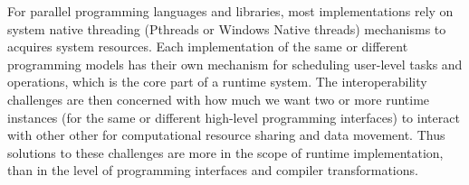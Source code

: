 For parallel programming languages and libraries, most implementations rely on system native threading (Pthreads or Windows Native threads) 
mechanisms to acquires system resources. Each implementation of the same or different programming models has their own mechanism for scheduling
user-level tasks and operations, which is the core part of a runtime system. 
The interoperability challenges are then concerned with how much we want two or more 
runtime instances (for the same or different high-level programming interfaces) to interact with other other for computational resource sharing
and data movement. Thus solutions to these challenges are more in the scope of runtime implementation, than in the level of programming
interfaces and compiler transformations. 


